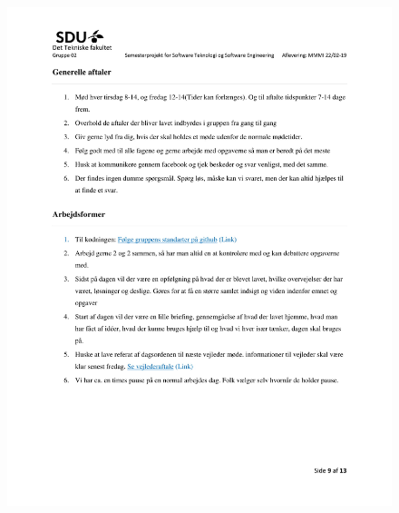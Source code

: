\begin{figure}[hb]
  \includegraphics[scale = 0.33]{./PNG/Projektforslag/Projektforslag-09.jpg} 
\end{figure}

